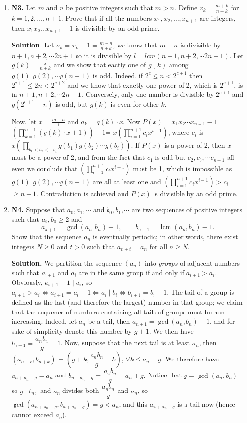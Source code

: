 \documentclass[11pt,a4paper]{article}
\begin{document}
\begin{enumerate}
\item\textbf{N3.} Let $m$ and $n$ be positive integers such that $m>n$. Define $x_k=\frac{m+k}{n+k}$ for $k=1,2,\ldots,n+1$. Prove that if all the numbers $x_1,x_2,\ldots,x_{n+1}$ are integers, then $x_1x_2\ldots x_{n+1}-1$ is divisible by an odd prime.

\textbf{Solution.} Let $a_k=x_k-1=\frac{m-n}{n+k}$, we know that $m-n$ is divisible by $n+1, n+2, \cdots 2n+1$ so it is divisible by $l=lcm(n+1, n+2, \cdots 2n+1)$. Let $g(k)=\frac{x}{n+k}$ and we show that eactly one of $g(k)$ among $g(1), g(2),\cdots g(n+1)$ is odd. Indeed, if $2^c\le n< 2^{c+1}$ then $2^{c+1}\le 2n<2^{c+2}$ and we know that exactly one power of 2, which is $2^{c+1}$, is in $n+1, n+2,\cdots 2n+1$. Conversely, only one number is divisible by $2^{c+1}$ and $g(2^{c+1}-n)$ is odd, but $g(k)$ is even for other $k$.

Now, let $x=\frac{m-n}{l}$ and $a_k=g(k)\cdot x$. Now $P(x)=x_1x_2\cdots x_{n+1}-1$ = $(\prod_{k=1}^{n+1} (g(k)\cdot x+1))-1$= $x(\prod_{i=1}^{n+1} c_ix^{i-1})$, where $c_i$ is $x(\prod_{b_1<b_2<\cdots b_i} g(b_1)g(b_2)\cdots g(b_{i}))$. If $P(x)$ is a power of 2, then $x$ must be a power of 2, and from the fact that $c_1$ is odd but $c_2, c_3, \cdots c_{n+1}$ all even we conclude that $(\prod_{i=1}^{n+1} c_ix^{i-1})$ must be 1, which is impossible as $g(1), g(2),\cdots g(n+1)$ are all at least one and $(\prod_{i=1}^{n+1} c_ix^{i-1})>c_i$ $\ge n+1$. Contradiction is achieved and $P(x)$ is divisible by an odd prime.

\item\textbf{N4.} Suppose that $a_0, a_1, \cdots $ and $b_0, b_1, \cdots$ are two sequences of positive integers such that $a_0, b_0 \ge 2$ and \[ a_{n+1} = \gcd{(a_n, b_n)} + 1, \qquad b_{n+1} = \operatorname{lcm}{(a_n, b_n)} - 1. \]Show that the sequence $a_n$ is eventually periodic; in other words, there exist integers $N \ge 0$ and $t > 0$ such that $a_{n+t} = a_n$ for all $n \ge N$.

\textbf{Solution.} We partition the sequence $(a_n)$ into \emph{groups} of adjacent numbers such that $a_{i+1}$ and $a_i$ are in the same group if and only if $a_{i+1}>a_i$. Obviously, $a_{i+1}-1\mid a_i$, so $a_{i+1}>a_i\Leftrightarrow a_{i+1}=a_i +1\Leftrightarrow a_i\mid b_i\Leftrightarrow b_{i+1}=b_{i}-1$. The tail of a group is defined as the last (and therefore the largest) number in that group; we claim that the sequence of numbers containing all tails of groups must be non-increasing. 
Indeed, let $a_n$ be a tail, then $a_{n+1}=\gcd (a_n, b_n)+1$, and for sake of simplicity denote this number by $g+1$. 
We then have $b_{n+1}=\dfrac{a_nb_n}{g}-1$. 
Now, suppose that the next tail is at least $a_n$, then $(a_{n+k}, b_{n+k})$ = $(g+k, \dfrac{a_nb_n}{g}-k)$, $\forall k\le a_n-g$. We therefore have $a_{n+a_n-g}=a_n$ and $b_{n+a_n-g}$ = $\dfrac{a_nb_n}{g}-a_n+g.$ 
Notice that $g=\gcd (a_n, b_n)$ so $g\mid b_n,$ and $a_n$ divides both $\dfrac{a_nb_n}{g}$ and $a_n$, so $\gcd (a_{n+a_n-g}, b_{n+a_n-g})=g<a_n$, and this $a_{n+a_n-g}$ is a tail now (hence cannot exceed $a_n$).


\end{enumerate}
\end{document}

